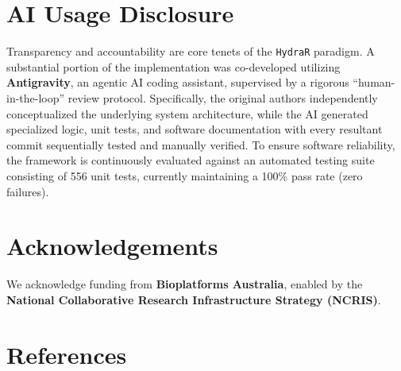 \documentclass[
]{article}
\begin{document}
\section{AI Usage Disclosure}\label{ai-usage-disclosure}

Transparency and accountability are core tenets of the \texttt{HydraR}
paradigm. A substantial portion of the implementation was co-developed
utilizing \textbf{Antigravity}, an agentic AI coding assistant,
supervised by a rigorous ``human-in-the-loop'' review protocol.
Specifically, the original authors independently conceptualized the
underlying system architecture, while the AI generated specialized
logic, unit tests, and software documentation with every resultant
commit sequentially tested and manually verified. To ensure software reliability, the framework is continuously evaluated against an automated testing suite consisting of 556 unit tests, currently maintaining a 100\% pass rate (zero failures).

\section{Acknowledgements}\label{acknowledgements}

We acknowledge funding from \textbf{Bioplatforms Australia}, enabled by
the \textbf{National Collaborative Research Infrastructure Strategy
(NCRIS)}.

\section*{References}\label{references}
\end{document}
